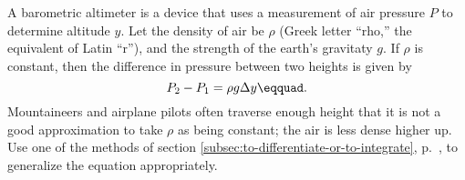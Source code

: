 A barometric altimeter is a device that uses a measurement of air pressure $P$ to determine
altitude $y$. Let the density of air be $\rho$ (Greek letter ``rho,'' the equivalent 
of Latin ``r''), and the strength of the earth's gravitaty $g$. If $\rho$ is constant, then the
difference in pressure between two heights is given by
\begin{equation*}
  P_2-P_1 = \rho g \Delta y\eqquad.
\end{equation*}
Mountaineers and airplane pilots often traverse enough height that it is not
a good approximation to take $\rho$ as being constant; the air is less dense higher up.
Use one of the methods of section \ref{subsec:to-differentiate-or-to-integrate},
p.~\pageref{subsec:to-differentiate-or-to-integrate}, to generalize the equation
appropriately.
